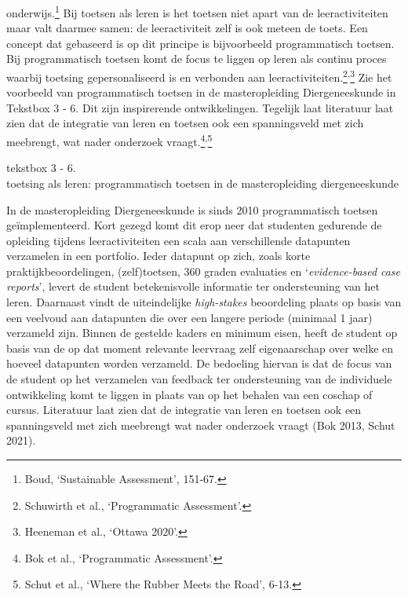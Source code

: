 \documentclass[smallauthor, chapterhaspagenum, nochapterinheader, pagenuminheader,  bigchapnum,medium2, tocpages, garamond, titleinheader]{jote-book}
\begin{document}
onderwijs.\footnote{Boud, ‘Sustainable Assessment', 151-67.} Bij toetsen als leren is het toetsen niet apart van de leeractiviteiten maar valt daarmee samen: de leeractiviteit zelf is ook meteen de toets. Een concept dat gebaseerd is op dit principe is bijvoorbeeld programmatisch toetsen. Bij programmatisch toetsen komt de focus te liggen op leren als continu proces waarbij toetsing gepersonaliseerd is en verbonden aan leeractiviteiten.\footnote{Schuwirth et al., ‘Programmatic Assessment'.}\textsuperscript{,}\footnote{Heeneman et al., ‘Ottawa 2020'.} Zie het voorbeeld van programmatisch toetsen in de masteropleiding Diergeneeskunde in Tekstbox 3 - 6. Dit zijn inspirerende ontwikkelingen. Tegelijk laat literatuur laat zien dat de integratie van leren en toetsen ook een spanningsveld met zich meebrengt, wat nader onderzoek vraagt.\footnote{Bok et al., ‘Programmatic Assessment'.}\textsuperscript{,}\footnote{Schut et al., ‘Where the Rubber Meets the Road', 6-13.}\emph{ }

	\begin{bookbox}{\raggedright tekstbox 3 - 6. \\toetsing als leren: programmatisch toetsen in de masteropleiding diergeneeskunde}
		In de masteropleiding Diergeneeskunde is sinds 2010 programmatisch toetsen geïmplementeerd. Kort gezegd komt dit erop neer dat studenten gedurende de opleiding tijdens leeractiviteiten een scala aan verschillende datapunten verzamelen in een portfolio. Ieder datapunt op zich, zoals korte praktijkbeoordelingen, (zelf)toetsen, 360 graden evaluaties en ‘\emph{evidence-based}\emph{ case }\emph{reports}', levert de student betekenisvolle informatie ter ondersteuning van het leren. Daarnaast vindt de uiteindelijke \emph{high-}\emph{stakes} beoordeling plaats op basis van een veelvoud aan datapunten die over een langere periode (minimaal 1 jaar) verzameld zijn. Binnen de gestelde kaders en minimum eisen, heeft de student op basis van de op dat moment relevante leervraag zelf eigenaarschap over welke en hoeveel datapunten worden verzameld. De bedoeling hiervan is dat de focus van de student op het verzamelen van feedback ter ondersteuning van de individuele ontwikkeling komt te liggen in plaats van op het behalen van een coschap of cursus. Literatuur laat zien dat de integratie van leren en toetsen ook een spanningsveld met zich meebrengt wat nader onderzoek vraagt (Bok 2013, Schut 2021).\emph{ }
	\end{bookbox}
\end{document}

